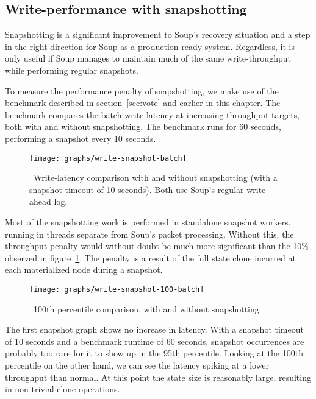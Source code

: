 \subsection{Write-performance with snapshotting}\label{sec:snapshot-write}

Snapshotting is a significant improvement to Soup's recovery situation and a
step in the right direction for Soup as a production-ready system. Regardless,
it is only useful if Soup manages to maintain much of the same write-throughput
while performing regular snapshots.

To measure the performance penalty of snapshotting, we make use of the
 benchmark described in section~\ref{sec:vote} and earlier in this
chapter. The benchmark compares the batch write latency at increasing throughput
targets, both with and without snapshotting. The benchmark runs for 60 seconds,
performing a snapshot every 10 seconds.

\begin{figure}[H]
  \texttt{[image: graphs/write-snapshot-batch]}
  \caption{\
    Write-latency comparison with and without snapshotting (with a snapshot
    timeout of 10 seconds). Both use Soup's regular write-ahead log.
  }\label{fig:graph-snapshot}
\end{figure}

Most of the snapshotting work is performed in standalone snapshot workers,
running in threads separate from Soup's packet processing. Without this, the
throughput penalty would without doubt be much more significant than the 10\%
observed in figure~\ref{fig:graph-snapshot}. The penalty is a result of the full
state clone incurred at each materialized node during a snapshot.

\begin{figure}[H]
  \texttt{[image: graphs/write-snapshot-100-batch]}
  \caption{\
    100th percentile comparison, with and without snapshotting.
  }\label{fig:graph-snapshot-100}
\end{figure}

The first snapshot graph shows no increase in latency. With a snapshot timeout
of 10 seconds and a benchmark runtime of 60 seconds, snapshot occurrences are
probably too rare for it to show up in the 95th percentile. Looking at the 100th
percentile on the other hand, we can see the latency spiking at a lower
throughput than normal. At this point the state size is reasonably large,
resulting in non-trivial clone operations.
